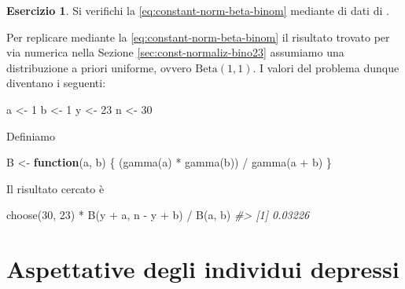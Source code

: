 \documentclass[
  11pt,
]{krantz}
\makeatletter
\newenvironment{Shaded}{\begin{snugshade}}{\end{snugshade}}
\newcommand{\CommentTok}[1]{\textcolor[rgb]{0.37,0.37,0.37}{\textit{#1}}}
\newcommand{\ControlFlowTok}[1]{\textcolor[rgb]{0.27,0.27,0.27}{\textbf{#1}}}
\newcommand{\DecValTok}[1]{\textcolor[rgb]{0.06,0.06,0.06}{#1}}
\newcommand{\FunctionTok}[1]{\textcolor[rgb]{0,0,0}{#1}}
\newcommand{\NormalTok}[1]{#1}
\newcommand{\OtherTok}[1]{\textcolor[rgb]{0.37,0.37,0.37}{#1}}
\newcommand{\SpecialCharTok}[1]{\textcolor[rgb]{0,0,0}{#1}}
\newenvironment{kframe}{%
\medskip{}
\setlength{\fboxsep}{.8em}
 \def\at@end@of@kframe{}%
 \ifinner\ifhmode%
  \def\at@end@of@kframe{\end{minipage}}%
  \begin{minipage}{\columnwidth}%
 \fi\fi%
 \def\FrameCommand##1{\hskip\@totalleftmargin \hskip-\fboxsep
 \colorbox{shadecolor}{##1}\hskip-\fboxsep
     \hskip-\linewidth \hskip-\@totalleftmargin \hskip\columnwidth}%
 \MakeFramed {\advance\hsize-\width
   \@totalleftmargin\z@ \linewidth\hsize
   \@setminipage}}%
 {\par\unskip\endMakeFramed%
 \at@end@of@kframe}
\renewenvironment{Shaded}{\begin{kframe}}{\end{kframe}}
\theoremstyle{definition}
\theoremstyle{definition}
\theoremstyle{definition}
\newtheorem{exercise}{Esercizio}[chapter]
\theoremstyle{definition}
\theoremstyle{remark}
\makeatother
\begin{document}
\begin{exercise}

Si verifichi la \eqref{eq:constant-norm-beta-binom} mediante di dati di \citet{zetschefuture2019}.

Per replicare mediante la \eqref{eq:constant-norm-beta-binom} il risultato trovato per via numerica nella Sezione \ref{sec:const-normaliz-bino23} assumiamo una distribuzione a priori uniforme, ovvero \(\mbox{Beta}(1, 1)\). I valori del problema dunque diventano i seguenti:

\begin{Shaded}
\begin{Highlighting}[]
\NormalTok{a }\OtherTok{\textless{}{-}} \DecValTok{1}
\NormalTok{b }\OtherTok{\textless{}{-}} \DecValTok{1}
\NormalTok{y }\OtherTok{\textless{}{-}} \DecValTok{23}
\NormalTok{n }\OtherTok{\textless{}{-}} \DecValTok{30}
\end{Highlighting}
\end{Shaded}

Definiamo

\begin{Shaded}
\begin{Highlighting}[]
\NormalTok{B }\OtherTok{\textless{}{-}} \ControlFlowTok{function}\NormalTok{(a, b) \{}
\NormalTok{  (}\FunctionTok{gamma}\NormalTok{(a) }\SpecialCharTok{*} \FunctionTok{gamma}\NormalTok{(b)) }\SpecialCharTok{/} \FunctionTok{gamma}\NormalTok{(a }\SpecialCharTok{+}\NormalTok{ b)}
\NormalTok{\}}
\end{Highlighting}
\end{Shaded}

Il risultato cercato è

\begin{Shaded}
\begin{Highlighting}[]
\FunctionTok{choose}\NormalTok{(}\DecValTok{30}\NormalTok{, }\DecValTok{23}\NormalTok{) }\SpecialCharTok{*} \FunctionTok{B}\NormalTok{(y }\SpecialCharTok{+}\NormalTok{ a, n }\SpecialCharTok{{-}}\NormalTok{ y }\SpecialCharTok{+}\NormalTok{ b) }\SpecialCharTok{/} \FunctionTok{B}\NormalTok{(a, b)}
\CommentTok{\#\textgreater{} [1] 0.03226}
\end{Highlighting}
\end{Shaded}

\end{exercise}

\hypertarget{es-pratico-zetsche}{%
\chapter{Aspettative degli individui depressi}\label{es-pratico-zetsche}}
\end{document}
